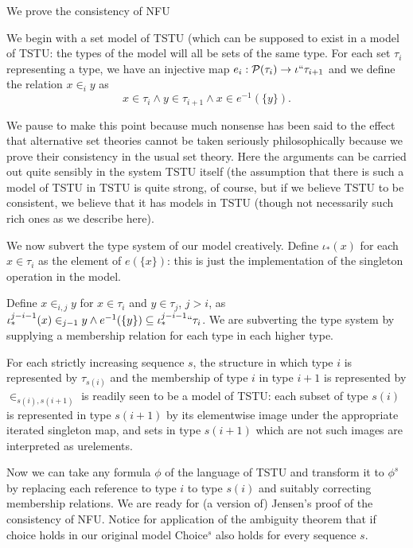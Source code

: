 \documentclass{slides}
\begin{document}
\begin{slide}

{\Large We prove the consistency of NFU}

We begin with a set model of TSTU (which can be supposed to exist in a model of TSTU:  the types of the model will all be sets of the same type.  For each
set $\tau_i$ representing a type, we have an injective map $e_i: {\cal P}(\tau_i) \rightarrow \iota``\tau_{i+1}$ and we define the relation $x \in_i y$ as
$$x\in \tau_i \wedge y \in \tau_{i+1} \wedge x \in e^{-1}(\{y\}).$$

We pause to make this point because much nonsense has been said to the effect that alternative set theories cannot be taken seriously philosophically because we prove their consistency in the usual set theory.  Here the arguments can be carried out quite sensibly in the system TSTU itself (the assumption that there is such a model of TSTU in TSTU is quite strong, of course, but if we believe TSTU to be consistent, we believe that it has models in TSTU (though not necessarily such rich ones as we describe here).

\end{slide}

\begin{slide}

We now subvert the type system of our model creatively.  Define $\iota_*(x)$ for each $x \in \tau_i$ as the element of $e(\{x\})$:  this is just the implementation of
the singleton operation in the model.

Define $x \in_{i,j} y$ for $x \in \tau_i$ and $y \in \tau_j$, $j>i$, as $\iota_*^{j-i-1}(x) \in_{j-1} y \wedge e^{-1}(\{y\}) \subseteq \iota_*^{j-i-1}``\tau_i$.  We are subverting the type system by supplying a membership
relation for each type in each higher type.

For each strictly increasing sequence $s$, the structure in which type $i$ is represented by $\tau_{s(i)}$ and the membership of type $i$ in type $i+1$ is represented
by $\in_{s(i),s(i+1)}$ is readily seen to be a model of TSTU:  each subset of type $s(i)$ is represented in type $s(i+1)$ by its elementwise image under the appropriate iterated singleton map,
and sets in type $s(i+1)$ which are not such images are interpreted as urelements.

\end{slide}

\begin{slide}

Now we can take any formula $\phi$ of the language of TSTU and transform it to $\phi^s$ by replacing each reference to type $i$ to type $s(i)$ and suitably correcting
membership relations.  We are ready for (a version of) Jensen's proof of the consistency of NFU.  Notice for application of the ambiguity theorem that if choice holds in our
original model Choice$^s$ also holds for every sequence $s$.

\end{slide}
\end{document}

